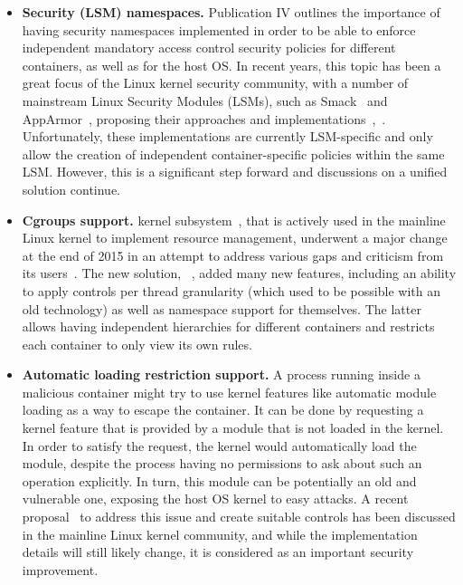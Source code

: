 \begin{itemize}
	\item \textbf{Security (LSM) namespaces.} Publication IV outlines the importance of having security namespaces implemented in order to be able to enforce independent mandatory access control security policies for different containers, as well as for the host OS. In recent years, this topic has been a great focus of the Linux kernel security community, with a number of mainstream Linux Security Modules (LSMs), such as Smack~\cite{smack} and AppArmor~\cite{bauer2006paranoid}, proposing their approaches and implementations~\cite{smackns},~\cite{apparmorns}. Unfortunately, these implementations are currently LSM-specific and only allow the creation of independent container-specific policies within the same LSM. However, this is a significant step forward and discussions on a unified solution continue.
	\item \textbf{Cgroups support.}  kernel subsystem~\cite{cgroupsv2}, that is actively used in the mainline Linux kernel to implement resource management, underwent a major change at the end of 2015 in an attempt to address various gaps and criticism from its users~\cite{rosen2016}. The new solution, ~\cite{cgroupsv2}, added many new features, including an ability to apply controls per thread granularity (which used to be possible with an old  technology) as well as namespace support for  themselves. The latter allows having independent  hierarchies for different containers and restricts each container to only view its own  rules. 
	\item \textbf{Automatic loading restriction support.} A process running inside a malicious container might try to use kernel features like automatic module loading as a way to escape the container. It can be done by requesting a kernel feature that is provided by a module that is not loaded in the kernel. In order to satisfy the request, the kernel would automatically load the module, despite the process having no permissions to ask about such an operation explicitly. In turn, this module can be potentially an old and vulnerable one, exposing the host OS kernel to easy attacks. A recent proposal~\cite{harouni2017} to address this issue and create suitable controls has been discussed in the mainline Linux kernel community, and while the implementation details will still likely change, it is considered as an important security improvement. 

\end{itemize}
